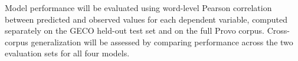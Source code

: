 \documentclass[12pt]{article}
\begin{document}
Model performance will be evaluated using word-level Pearson correlation
between predicted and observed values for each dependent variable, computed
separately on the GECO held-out test set and on the full Provo corpus.
Cross-corpus generalization will be assessed by comparing performance across
the two evaluation sets for all four models.

\newpage


\end{document}
